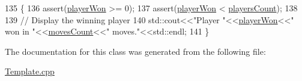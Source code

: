 \begin{DoxyCode}
135                        \{
136     assert(\hyperlink{classwikibooks__design__patterns_1_1Game_a6385d85f068769843e22f7741a4ae154}{playerWon} >= 0);
137     assert(\hyperlink{classwikibooks__design__patterns_1_1Game_a6385d85f068769843e22f7741a4ae154}{playerWon} < \hyperlink{classwikibooks__design__patterns_1_1Game_a8641adb02e0f068ff9ecb6c375562d7b}{playersCount});
138 
139         \textcolor{comment}{// Display the winning player}
140     std::cout<<\textcolor{stringliteral}{"Player "}<<\hyperlink{classwikibooks__design__patterns_1_1Game_a6385d85f068769843e22f7741a4ae154}{playerWon}<<\textcolor{stringliteral}{" won in "}<<\hyperlink{classwikibooks__design__patterns_1_1Game_ac7bac015fe2e5ead905f7fb8ae63d3aa}{movesCount}<<\textcolor{stringliteral}{" moves."}<<std::endl;
141     \}
\end{DoxyCode}


The documentation for this class was generated from the following file\+:\begin{DoxyCompactItemize}
\item 
\hyperlink{Template_8cpp}{Template.\+cpp}\end{DoxyCompactItemize}
